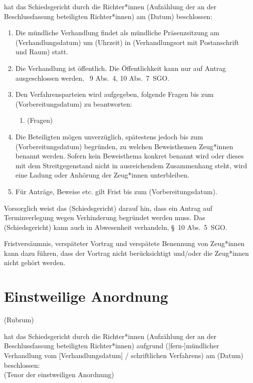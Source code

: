 hat das Schiedsgericht durch die Richter*innen (Aufzählung der an der Beschlussfassung beteiligten Richter*innen) am (Datum) beschlossen:\\
\begin{enumerate}
\item	Die mündliche Verhandlung findet als mündliche Präsenzsitzung am (Verhandlungsdatum) um (Uhrzeit) in (Verhandlungsort mit Postanschrift und Raum) statt.
\item	Die Verhandlung ist öffentlich.
	Die Öffentlichkeit kann nur auf Antrag ausgeschlossen werden, \SSS~9 Abs.~4, 10 Abs.~7~SGO.
\item	Den Verfahrensparteien wird aufgegeben, folgende Fragen bis zum (Vorbereitungsdatum) zu beantworten:
	\begin{enumerate}
	\item (Fragen)
	\end{enumerate}
\item	Die Beteiligten mögen unverzüglich, spätestens jedoch bis zum (Vorbereitungsdatum) begründen, zu welchen Beweisthemen Zeug*innen benannt werden.
	Sofern kein Beweisthema konkret benannt wird oder dieses mit dem Streitgegenstand nicht in ausreichendem Zusammenhang steht, wird eine Ladung oder Anhörung der Zeug*innen unterbleiben.
\item	Für Anträge, Beweise etc. gilt Frist bis zum (Vorbereitungsdatum).
\end{enumerate}

Vorsorglich weist das (Schiedsgericht) darauf hin, dass ein Antrag auf Terminverlegung wegen Verhinderung begründet werden muss.
Das (Schiedsgericht) kann auch in Abwesenheit verhandeln, \S~10 Abs.~5~SGO.

Fristversäumnis, verspäteter Vortrag und verspätete Benennung von Zeug*innen kann dazu führen, dass der Vortrag nicht berücksichtigt und/oder die Zeug*innen nicht gehört werden.

\section{Einstweilige Anordnung}
\label{Vorlage:Einstweilige}
(Rubrum)

hat das Schiedsgericht durch die Richter*innen (Aufzählung der an der Beschlussfassung beteiligten Richter*innen) aufgrund ([fern-]mündlicher Verhandlung vom [Verhandlungsdatum] / schriftlichen Verfahrens) am (Datum) beschlossen:\\
(Tenor der einstweiligen Anordnung)

